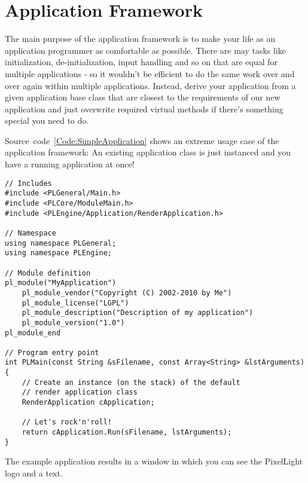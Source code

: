 \chapter{Application Framework}
The main purpose of the application framework is to make your life as an application programmer as comfortable as possible. There are may tasks like initialization, de-initialization, input handling and so on that are equal for multiple applications - so it wouldn't be efficient to do the same work over and over again within multiple applications. Instead, derive your application from a given application base class that are closest to the requirements of our new application and just overwrite required virtual methods if there's something special you need to do.

Source~code~\ref{Code:SimpleApplication} shows an extreme usage case of the application framework: An existing application class is just instanced and you have a running application at once!
\begin{lstlisting}[label=Code:SimpleApplication,caption={Simple application using the application framework}]
// Includes
#include <PLGeneral/Main.h>
#include <PLCore/ModuleMain.h>
#include <PLEngine/Application/RenderApplication.h>

// Namespace
using namespace PLGeneral;
using namespace PLEngine;

// Module definition
pl_module("MyApplication")
	pl_module_vendor("Copyright (C) 2002-2010 by Me")
	pl_module_license("LGPL")
	pl_module_description("Description of my application")
	pl_module_version("1.0")
pl_module_end

// Program entry point
int PLMain(const String &sFilename, const Array<String> &lstArguments)
{
	// Create an instance (on the stack) of the default
	// render application class
	RenderApplication cApplication;

	// Let's rock'n'roll!
	return cApplication.Run(sFilename, lstArguments);
}
\end{lstlisting}
The example application results in a window in which you can see the PixelLight logo and a text.
